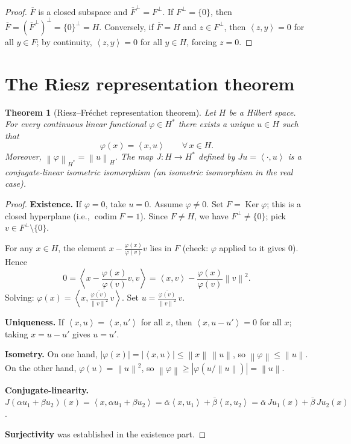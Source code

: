 \documentclass[a4paper,12pt]{book}
\DeclareMathOperator{\Ker}{Ker}
\DeclareMathOperator{\codim}{codim}
\newcommand{\norm}[1]{\left\| #1 \right\|}
\newcommand{\abs}[1]{\left| #1 \right|}
\newcommand{\inner}[2]{\left\langle #1, #2 \right\rangle}
\theoremstyle{definition}
\theoremstyle{plain}
\newtheorem{theorem}[definition]{Theorem}
\theoremstyle{remark}
\begin{document}
\begin{proof}
$\overline{F}$ is a closed subspace and $\overline{F}^\perp=F^\perp$.
If $F^\perp=\{0\}$, then $\overline{F}=(\overline{F}^\perp)^\perp=\{0\}^\perp=H$.
Conversely, if $\overline{F}=H$ and $z\in F^\perp$, then $\inner{z}{y}=0$
for all $y\in F$; by continuity, $\inner{z}{y}=0$ for all $y\in H$,
forcing $z=0$.
\end{proof}

\section{The Riesz representation theorem}
\label{sec:riesz-representation}

\begin{theorem}[{Riesz--Fr\'echet representation theorem}]
\label{thm:riesz-frechet}
Let $H$ be a Hilbert space.  For every continuous linear functional
$\varphi\in H^*$ there exists a unique $u\in H$ such that
\[
  \varphi(x) = \inner{x}{u} \qquad\forall\, x\in H.
\]
Moreover, $\norm{\varphi}_{H^*}=\norm{u}_H$.  The map
$J:H\to H^*$ defined by $Ju = \inner{\cdot}{u}$ is a
conjugate-linear isometric isomorphism
(an isometric isomorphism in the real case).
\end{theorem}

\begin{proof}
\textbf{Existence.}
If $\varphi=0$, take $u=0$.  Assume $\varphi\ne 0$.
Set $F=\Ker\varphi$; this is a closed hyperplane
(i.e., $\codim F=1$).  Since $F\ne H$, we have $F^\perp\ne\{0\}$;
pick $v\in F^\perp\setminus\{0\}$.

For any $x\in H$, the element $x-\frac{\varphi(x)}{\varphi(v)}v$ lies in
$F$ (check: $\varphi$ applied to it gives $0$).  Hence
\[
  0 = \inner{x-\frac{\varphi(x)}{\varphi(v)}v}{v}
  = \inner{x}{v} - \frac{\varphi(x)}{\varphi(v)}\norm{v}^2.
\]
Solving: $\varphi(x) = \inner{x}{\frac{\overline{\varphi(v)}}{\norm{v}^2}\,v}$.
Set $u = \frac{\overline{\varphi(v)}}{\norm{v}^2}\,v$.

\textbf{Uniqueness.}  If $\inner{x}{u}=\inner{x}{u'}$ for all $x$,
then $\inner{x}{u-u'}=0$ for all $x$; taking $x=u-u'$ gives $u=u'$.

\textbf{Isometry.}  On one hand,
$\abs{\varphi(x)}=\abs{\inner{x}{u}}\le\norm{x}\,\norm{u}$, so
$\norm{\varphi}\le\norm{u}$.  On the other hand,
$\varphi(u)=\norm{u}^2$, so
$\norm{\varphi}\ge\abs{\varphi(u/\norm{u})}=\norm{u}$.

\textbf{Conjugate-linearity.}
$J(\alpha u_1+\beta u_2)(x)
=\inner{x}{\alpha u_1+\beta u_2}
=\bar\alpha\inner{x}{u_1}+\bar\beta\inner{x}{u_2}
=\bar\alpha\,Ju_1(x)+\bar\beta\,Ju_2(x)$.

\textbf{Surjectivity} was established in the existence part.
\end{proof}
\end{document}
